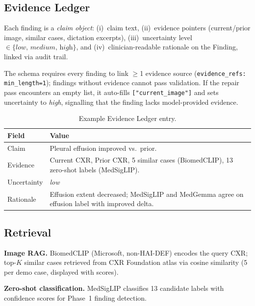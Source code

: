 \documentclass[10pt,twocolumn]{article}
\begin{document}
\subsection{Evidence Ledger}

Each finding is a \emph{claim object}: (i)~claim text, (ii)~evidence pointers (current/prior image, similar cases, dictation excerpts), (iii)~uncertainty level $\in \{\textit{low},\, \textit{medium},\, \textit{high}\}$, and (iv)~clinician-readable rationale on the Finding, linked via audit trail.

The schema requires every finding to link $\geq$1 evidence source (\texttt{evidence\_refs: min\_length=1}); findings without evidence cannot pass validation.
If the repair pass encounters an empty list, it auto-fills \texttt{["current\_image"]} and sets uncertainty to \textit{high}, signalling that the finding lacks model-provided evidence.

\begin{table}[h]
\centering
\small
\caption{Example Evidence Ledger entry.}
\label{tab:ledger_example}
\begin{tabularx}{\columnwidth}{@{}lX@{}}
\toprule
\textbf{Field} & \textbf{Value} \\
\midrule
Claim       & Pleural effusion improved vs.\ prior. \\
Evidence    & Current CXR, Prior CXR, 5 similar cases (BiomedCLIP), 13 zero-shot labels (MedSigLIP). \\
Uncertainty & \textit{low} \\
Rationale   & Effusion extent decreased; MedSigLIP and MedGemma agree on effusion label with improved delta. \\
\bottomrule
\end{tabularx}
\end{table}

\subsection{Retrieval}

\textbf{Image RAG.}
BiomedCLIP (Microsoft, non-HAI-DEF) encodes the query CXR; top-$K$ similar cases retrieved from CXR Foundation atlas via cosine similarity (5 per demo case, displayed with scores).

\textbf{Zero-shot classification.}
MedSigLIP classifies 13 candidate labels with confidence scores for Phase~1 finding detection.
\end{document}
